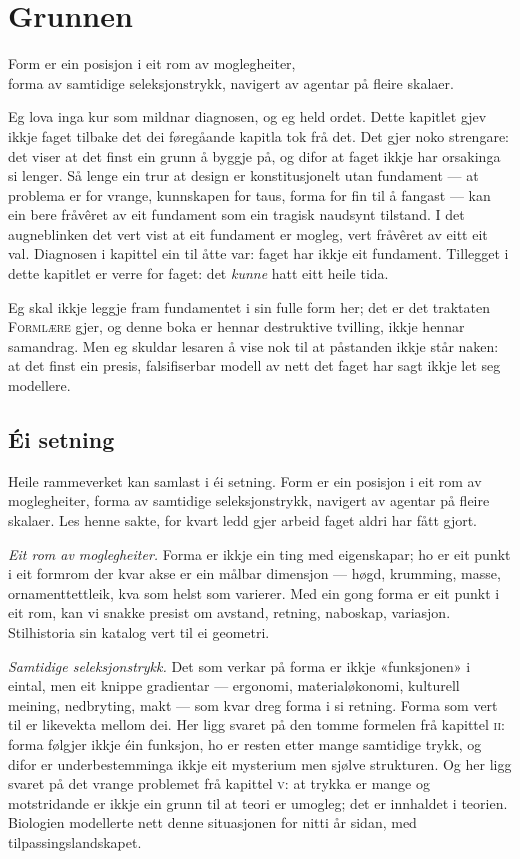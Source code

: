 \chapter{Grunnen}

\begin{motto}
Form er ein posisjon i eit rom av moglegheiter,\\ forma av samtidige seleksjonstrykk, navigert av agentar på fleire skalaer.
\end{motto}

Eg lova inga kur som mildnar diagnosen, og eg held ordet. Dette kapitlet gjev ikkje faget tilbake det dei føregåande kapitla tok frå det. Det gjer noko strengare: det viser at det finst ein grunn å byggje på, og difor at faget ikkje har orsakinga si lenger. Så lenge ein trur at design er konstitusjonelt utan fundament — at problema er for vrange, kunnskapen for taus, forma for fin til å fangast — kan ein bere fråvêret av eit fundament som ein tragisk naudsynt tilstand. I det augneblinken det vert vist at eit fundament er mogleg, vert fråvêret av eitt eit val. Diagnosen i kapittel ein til åtte var: faget har ikkje eit fundament. Tillegget i dette kapitlet er verre for faget: det \emph{kunne} hatt eitt heile tida.

Eg skal ikkje leggje fram fundamentet i sin fulle form her; det er det traktaten \textsc{Formlære} gjer, og denne boka er hennar destruktive tvilling, ikkje hennar samandrag. Men eg skuldar lesaren å vise nok til at påstanden ikkje står naken: at det finst ein presis, falsifiserbar modell av nett det faget har sagt ikkje let seg modellere.

\section{Éi setning}

Heile rammeverket kan samlast i éi setning. Form er ein posisjon i eit rom av moglegheiter, forma av samtidige seleksjonstrykk, navigert av agentar på fleire skalaer. Les henne sakte, for kvart ledd gjer arbeid faget aldri har fått gjort.

\emph{Eit rom av moglegheiter.} Forma er ikkje ein ting med eigenskapar; ho er eit punkt i eit formrom der kvar akse er ein målbar dimensjon — høgd, krumming, masse, ornamenttettleik, kva som helst som varierer. Med ein gong forma er eit punkt i eit rom, kan vi snakke presist om avstand, retning, naboskap, variasjon. Stilhistoria sin katalog vert til ei geometri.

\emph{Samtidige seleksjonstrykk.} Det som verkar på forma er ikkje «funksjonen» i eintal, men eit knippe gradientar — ergonomi, materialøkonomi, kulturell meining, nedbryting, makt — som kvar dreg forma i si retning. Forma som vert til er likevekta mellom dei. Her ligg svaret på den tomme formelen frå kapittel \textsc{ii}: forma følgjer ikkje éin funksjon, ho er resten etter mange samtidige trykk, og difor er underbestemminga ikkje eit mysterium men sjølve strukturen. Og her ligg svaret på det vrange problemet frå kapittel \textsc{v}: at trykka er mange og motstridande er ikkje ein grunn til at teori er umogleg; det er innhaldet i teorien. Biologien modellerte nett denne situasjonen for nitti år sidan, med tilpassingslandskapet.


